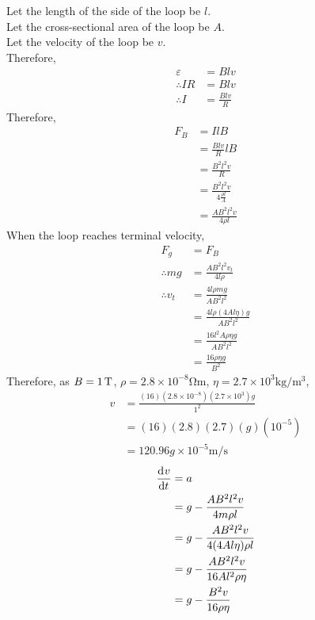 \documentclass[fleqn, a4paper, 11pt, oneside]{amsart}
\theoremstyle{definition}
\theoremstyle{theorem}
\begin{document}
\begin{solution}
	Let the length of the side of the loop be $l$.\\
	Let the cross-sectional area of the loop be $A$.\\
	Let the velocity of the loop be $v$.\\
	Therefore,
	\begin{align*}
		\varepsilon &= B l v\\
		\therefore I R &= B l v\\
		\therefore I &= \frac{B l v}{R}
	\end{align*}
	Therefore,
	\begin{align*}
		F_B &= I l B\\
		&= \frac{B l v}{R} l B\\
		&= \frac{B^2 l^2 v}{R}\\
		&= \frac{B^2 l^2 v}{4 \frac{\rho l}{A}}\\
		&= \frac{A B^2 l^2 v}{4 \rho l}
	\end{align*}
	When the loop reaches terminal velocity,
	\begin{align*}
		F_g &= F_B\\
		\therefore m g &= \frac{A B^2 l^2 v_t}{4 l \rho}\\
		\therefore v_t &= \frac{4 l \rho m g}{A B^2 l^2}\\
		&= \frac{4 l \rho (4 A l \eta) g }{A B^2 l^2}\\
		&= \frac{16 l^2 A \rho \eta g}{A B^2 l^2}\\
		&= \frac{16 \rho \eta g}{B^2}
	\end{align*}
	Therefore, as $B = 1 \tesla$, $\rho = 2.8 \times 10^{-8} \si{\ohm\metre}$, $\eta = 2.7 \times 10^3 \si{\kg\per\metre\cubed}$,\\
	\begin{align*}
		v &= \frac{(16) \left( 2.8 \times 10^{-8} \right) \left( 2.7 \times 10^3 \right) g}{1^2}\\
		&= (16) (2.8) (2.7) (g) \left( 10^{-5} \right)\\
		&= 120.96 g \times 10^{-5} \si{\metre\per\second}
	\end{align*}
	\begin{align*}
		\dod{v}{t} &= a\\
		&= g - \frac{A B^2 l^2 v}{4 m \rho l}\\
		&= g - \frac{A B^2 l^2 v}{4 (4 A l \eta) \rho l}\\
		&= g - \frac{A B^2 l^2 v}{ 16 A l^2 \rho \eta}\\
		&= g - \frac{B^2 v}{16 \rho \eta}\\

\end{align*}
\end{solution}
\end{document}

